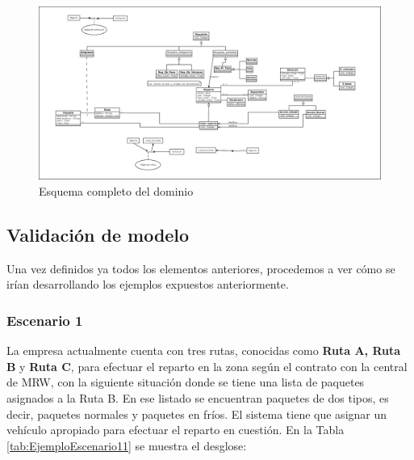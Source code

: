 \begin{figure}[H]
  \centering
  \includegraphics[scale=0.20, angle=90]{imaxes/Diagrama_Dominio_Completo.png}
  \caption{\label{fig:DominioCompleto}Esquema completo del dominio}
\end{figure}


\subsection{Validación de modelo}

Una vez definidos ya todos los elementos anteriores, procedemos a ver cómo se irían desarrollando los ejemplos expuestos anteriormente.

\subsubsection{Escenario 1}

La empresa actualmente cuenta con tres rutas, conocidas como \textbf{Ruta A, Ruta B} y \textbf{Ruta C}, para efectuar el reparto en la zona según el contrato con la central de MRW, con la siguiente situación donde se tiene una lista de paquetes asignados a la Ruta B. En ese listado se encuentran paquetes de dos tipos, es decir, paquetes normales y paquetes en fríos. El sistema tiene que asignar un vehículo apropiado para efectuar el reparto en cuestión. En la Tabla \ref{tab:EjemploEscenario11} se muestra el desglose:

